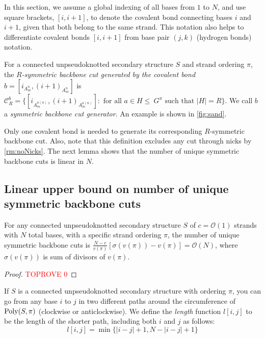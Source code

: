 \begin{remark}\label{rm:noNicks}
	In this section, we assume a global indexing of all bases from $1$ to $N$, and use square brackets, $[i, i+1]$, to  denote the covalent bond connecting bases $i$ and $i +1$, given that both belong to the same strand. This notation also helps to differentiate covalent bonds $[i, i+1]$ from base pair $(j,k)$ (hydrogen bonds)  notation. 
\end{remark}

\begin{Definition}\label{def:cut}
	For  a connected unpseudoknotted secondary structure $S$ and strand ordering $\pi$, the {\em $R$-symmetric backbone cut generated by the covalent bond} $b=[i_{A_m^n}, (i+1)_{A_m^n}]$ is $\mathcal{C}_R^b = \{ [i_{A_m^{a(n)}}, ({i+1})_{A_{m}^{a(n)}}]: \textrm{ for all } a \in H \!\!\leq \!\! \!\ G^\pi \textrm{ such that } |H| = R \}$. We call $b$ a {\em symmetric backbone cut generator}. An example is shown in \cref{fig:sand}.
\end{Definition}


Only one covalent bond is needed to generate its corresponding $R$-symmetric backbone cut. Also, note that this definition excludes any cut through nicks by \cref{rm:noNicks}. The next lemma shows that the number of unique symmetric backbone cuts is linear in $N$.

\subsection{Linear upper bound on number of unique symmetric backbone cuts}

\begin{lemma}\label{lem:ub}
	For any connected unpseudoknotted secondary structure $S$ of $c=\mathcal{O}(1)$ strands with $N$ total bases, with a specific strand ordering $\pi$, the number of  unique symmetric backbone cuts is $\frac{N-c}{v(\pi)} \left[ \sigma(v(\pi))-v(\pi) \right] = \mathcal{O}(N)$, where $\sigma(v(\pi))$ is sum of divisors of $v(\pi)$. 
\end{lemma}

\begin{proof}\textcolor{red}{TOPROVE 0}\end{proof}


If $S$ is a connected unpseudoknotted secondary structure with ordering $\pi$, you can go from any base $i$ to $j$ in two different paths around the circumference of $\mathrm{Poly}(S,\pi)$ (clockwise or anticlockwise). We define the \emph{length} function $l[i,j]$ to be the length of the shorter path, including both $i$ and $j$ as follows: 
\begin{equation}
	l[i,j] = \min \{|i-j|+1,N-|i-j|+1\}
\end{equation} 

